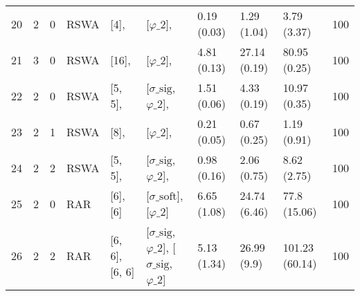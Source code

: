 \begin{tabular}{lrrllllllr}
    20 & 2     & 0     & RSWA        & [4],           & [$\varphi\_{2}$],                                                                    & 0.19 (0.03)                 & 1.29 (1.04)     & 3.79 (3.37)    & 100 \\
    21 & 3     & 0     & RSWA        & [16],          & [$\varphi\_{2}$],                                                                    & 4.81 (0.13)                 & 27.14 (0.19)    & 80.95 (0.25)   & 100 \\
    22 & 2     & 0     & RSWA        & [5, 5],        & [$\sigma\_{\mathrm{sig}}$,$\varphi\_{2}$],                                           & 1.51 (0.06)                 & 4.33 (0.19)     & 10.97 (0.35)   & 100 \\
    23 & 2     & 1     & RSWA        & [8],           & [$\varphi\_{2}$],                                                                    & 0.21 (0.05)                 & 0.67 (0.25)     & 1.19 (0.91)    & 100 \\
    24 & 2     & 2     & RSWA        & [5, 5],        & [$\sigma\_{\mathrm{sig}}$,$\varphi\_{2}$],                                           & 0.98 (0.16)                 & 2.06 (0.75)     & 8.62 (2.75)    & 100 \\
    25 & 2     & 0     & RAR         & [6], [6]       & [$\sigma\_{\mathrm{soft}}$], [$\varphi\_{2}$]                                        & 6.65 (1.08)                 & 24.74 (6.46)    & 77.8 (15.06)   & 100 \\
    26 & 2     & 2     & RAR         & [6, 6], [6, 6] & [$\sigma\_{\mathrm{sig}}$,$\varphi\_{2}$], [$\sigma\_{\mathrm{sig}}$,$\varphi\_{2}$] & 5.13 (1.34)                 & 26.99 (9.9)     & 101.23 (60.14) & 100 \\
    \bottomrule
\end{tabular}
